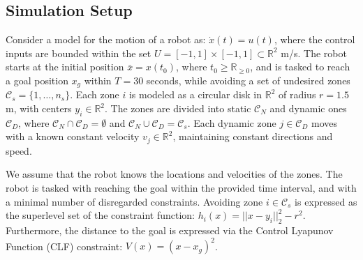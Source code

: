 \documentclass[letterpaper, 10 pt, conference]{ieeeconf}  %
\begin{document}
\subsection{Simulation Setup}
 Consider a model for the motion of a robot as:
    \( \dot x(t) = u(t) \),
where the control inputs are bounded within the set $U = [-1,1]\times [-1,1] \subset \mathbb R^2$ m/s. The robot starts at the initial position $\bar x = x(t_0)$, where $t_0 \geq \mathbb R_{\geq 0}$, and is tasked to reach a goal position $x_g$ within $T=30$ seconds, while avoiding a set of undesired zones $\mathcal C_s=\{1,\dots, n_s\}$. Each zone $i$ is modeled as a circular disk in $\mathbb R^2$ of radius $r = 1.5$ m, with centers $y_i\in \mathbb R^2$. The zones are divided into static $\mathcal C_N$ and dynamic ones $\mathcal C_D$, where $\mathcal C_N\cap \mathcal C_D=\emptyset$ and $\mathcal C_N\cup \mathcal C_D=\mathcal C_s$. Each dynamic zone $j\in \mathcal C_D$ moves with a known constant velocity $v_j \in \mathbb R^2$, maintaining constant directions and speed. 
\par 
We assume that the robot knows the locations and velocities of the zones. The robot is tasked with reaching the goal within the provided time interval, and with a minimal number of disregarded constraints. Avoiding zone $i \in \mathcal C_s$ is expressed as the superlevel set of the constraint function: 
     \(  h_i(x)= ||x-y_i||_2^2 - r^2 \).
Furthermore, the distance to the goal is expressed via the Control Lyapunov Function (CLF) constraint:
 \(  V(x)=(x-x_g)^2 \).
\end{document}
